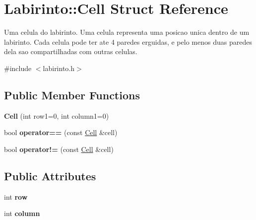 \hypertarget{struct_labirinto_1_1_cell}{}\section{Labirinto\+:\+:Cell Struct Reference}
\label{struct_labirinto_1_1_cell}


Uma celula do labirinto. Uma celula representa uma posicao unica dentro de um labirinto. Cada celula pode ter ate 4 paredes erguidas, e pelo menos duas paredes dela sao compartilhadas com outras celulas.  




{\ttfamily \#include $<$labirinto.\+h$>$}

\subsection*{Public Member Functions}
\begin{DoxyCompactItemize}
\item 
\hypertarget{struct_labirinto_1_1_cell_aa735a6cb4e37085c242b8c200d0a729d}{}{\bfseries Cell} (int row1=0, int column1=0)\label{struct_labirinto_1_1_cell_aa735a6cb4e37085c242b8c200d0a729d}

\item 
\hypertarget{struct_labirinto_1_1_cell_af3382e18a5b6a242b8137b87ac12815e}{}bool {\bfseries operator==} (const \hyperlink{struct_labirinto_1_1_cell}{Cell} \&cell)\label{struct_labirinto_1_1_cell_af3382e18a5b6a242b8137b87ac12815e}

\item 
\hypertarget{struct_labirinto_1_1_cell_a1bfd0a386eeec3e9b71475aa6d6cb31a}{}bool {\bfseries operator!=} (const \hyperlink{struct_labirinto_1_1_cell}{Cell} \&cell)\label{struct_labirinto_1_1_cell_a1bfd0a386eeec3e9b71475aa6d6cb31a}

\end{DoxyCompactItemize}
\subsection*{Public Attributes}
\begin{DoxyCompactItemize}
\item 
\hypertarget{struct_labirinto_1_1_cell_a094694f9bdd13307f6cdfca482d779da}{}int {\bfseries row}\label{struct_labirinto_1_1_cell_a094694f9bdd13307f6cdfca482d779da}

\item 
\hypertarget{struct_labirinto_1_1_cell_aa85f760fe383c41a959b5a188eebb010}{}int {\bfseries column}\label{struct_labirinto_1_1_cell_aa85f760fe383c41a959b5a188eebb010}

\end{DoxyCompactItemize}


